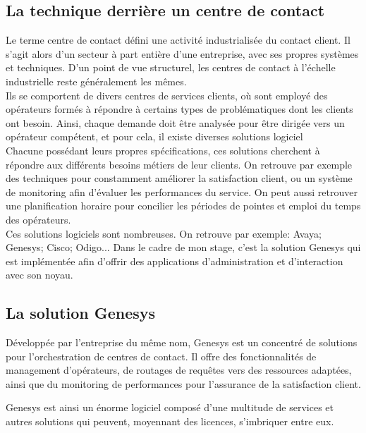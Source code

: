\documentclass{rapport}
\begin{document}
\subsection{La technique derrière un centre de contact}

Le terme centre de contact défini une activité industrialisée du contact client. Il s'agit alors d'un secteur à part entière d'une entreprise, avec ses propres systèmes et techniques.
D'un point de vue structurel, les centres de contact à l'échelle industrielle reste généralement les mêmes.\\

Ils se comportent de divers centres de services clients, où sont employé des opérateurs formés à répondre à certains types de problématiques dont les clients ont besoin. Ainsi, chaque demande doit être analysée pour être dirigée vers un opérateur compétent, et pour cela, il existe diverses solutions logiciel\\

Chacune possédant leurs propres spécifications, ces solutions cherchent à répondre aux différents besoins métiers de leur clients.
On retrouve par exemple des techniques pour constamment améliorer la satisfaction client, ou un système de monitoring afin d'évaluer les performances du service. On peut aussi retrouver une planification horaire pour concilier les périodes de pointes et emploi du temps des opérateurs.\\

Ces solutions logiciels sont nombreuses. On retrouve par exemple:
Avaya; Genesys; Cisco; Odigo...
Dans le cadre de mon stage, c'est la solution Genesys qui est implémentée afin d'offrir des applications d'administration et d'interaction avec son noyau.

\subsection{La solution Genesys}

Développée par l'entreprise du même nom, Genesys est un concentré de solutions pour l'orchestration de centres de contact. Il offre des fonctionnalités de management d'opérateurs, de routages de requêtes vers des ressources adaptées, ainsi que du monitoring de performances pour l'assurance de la satisfaction client.\\


Genesys est ainsi un énorme logiciel composé d'une multitude de services et autres solutions qui peuvent, moyennant des licences, s'imbriquer entre eux.\\
\end{document}
